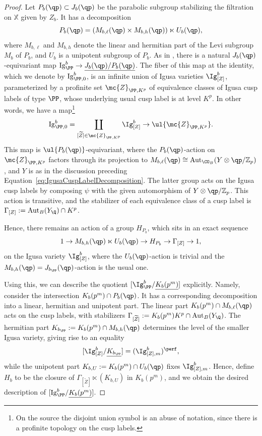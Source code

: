 \documentclass[letterpaper,11pt]{amsart}
\begin{document}
\begin{proof}
Let $P_b(\qp)\subset J_b(\qp)$ be the parabolic subgroup stabilizing the filtration on $\mathbb{X}$ given by $Z_b$. It has a decomposition
\[P_b(\qp)=(M_{b,\ell}(\qp)\times M_{b,h}(\qp))\ltimes U_b(\qp),\]
where $M_{b,\ell}$ and $M_{b,h}$ denote the linear and hermitian part of the Levi subgroup $M_b$ of $P_b$, and $U_b$ is a unipotent subgroup of $P_b$.
As in \cite[Section 6.2.1]{CS2}, there is a natural $J_b(\qp)$-equivariant map $\mathrm{Ig}^{b}_{\PP}\to \underline{J_b(\qp)/P_b(\qp)}$. The fiber of this map at the identity, which we denote by $\mathrm{Ig}^{b}_{\PP,0}$, is an infinite  union of Igusa varieties $\Ig^{b}_{[Z]}$, parameterized by a profinite set $\mc{Z}_{\PP, K^p}$ of equivalence classes of Igusa cusp labels of type $\PP$, whose underlying usual cusp label is at level $K^p$. In other words, we have a map\footnote{On the source the disjoint union symbol is an abuse of notation, since there is a profinite topology on the cusp labels.}
\[\mathrm{Ig}^{b}_{\PP,0}=\coprod_{[\widetilde{Z}]\in \mc{Z}_{\PP,K^p}} \Ig^{b}_{[Z]}\to \ul{\mc{Z}_{\PP, K^p}}.\]
This map is $\ul{P_b(\qp)}$-equivariant, where the $P_b(\qp)$-action on $\mc{Z}_{\PP,K^p}$ factors through its projection to $M_{b,\ell}(\qp)\cong \operatorname{Aut}_{\CO_B}(Y\otimes \qp/\mathbb{Z}_p)$, and $Y$ is as in the discussion preceding Equation~\eqref{eq:IgusaCuspLabelDecomposition}. The latter group acts on the Igusa cusp labels by composing $\psi$ with the given automorphism of $Y\otimes \qp/\mathbb{Z}_p$. This action is transitive, and the stabilizer of each equivalence class of a cusp label is $\Gamma_{[Z]}:=\operatorname{Aut}_{B}(Y_\Q)\cap K^p$.

Hence, there remains an action of a group $H_{P_b}$, which sits in an exact sequence
\[1\to M_{b,h}(\qp)\ltimes U_b(\qp)\to H_{P_b}\to \Gamma_{[Z]}\to 1,\] 
on the Igusa variety $\Ig^{b}_{[Z]}$, where the $U_b(\qp)$-action is trivial and the $M_{b,h}(\qp)=J_{b_\PP}(\qp)$-action is the usual one. 

Using this, we can describe the quotient $[\Ig^{b}_{\PP}/\underline{K_b(p^m)}]$ explicitly. Namely, consider the intersection $K_b(p^m)\cap P_b(\qp)$. It has a corresponding decomposition into a linear, hermitian and unipotent part. The linear part $K_b(p^m)\cap M_{b,\ell}(\qp)$ acts on the cusp labels, with stabilizers $\Gamma_{[\widetilde{Z}]}:=K_b(p^m)K^p\cap \operatorname{Aut}_B(Y_{\Q})$. The hermitian part $K_{b_\PP}:=K_b(p^m)\cap M_{b,h}(\qp)$ determines the level of the smaller Igusa variety, giving rise to an equality 
\[[\Ig^{b}_{[Z]}/\underline{K_{b_\PP}}]=(\Ig^{b}_{[Z],m})^{\perf},\]
while the unipotent part $K_{b,U}:=K_b(p^m)\cap U_b(\qp)$ fixes $\Ig^{b}_{[Z],m}$. Hence, define $H_b$ to be the closure of $\Gamma_{[\widetilde{Z}]}\ltimes (K_{b,U})$ in $K_b(p^m)$, and we obtain the desired description of $[\mathrm{Ig}^{b}_{\PP}/\underline{K_b(p^m)}]$.
\end{proof}
\end{document}
